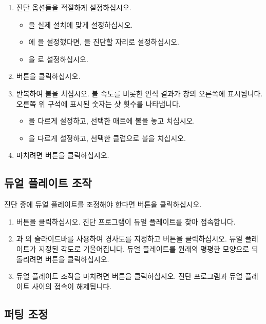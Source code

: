 \documentclass[10pt, openright, language=korean]{hzguide}
\begin{document}
\begin{enumerate}
\item 진단 옵션들을 적절하게 설정하십시오.
    \begin{itemize}
    \item {}을 실제 설치에 맞게 설정하십시오.
    \item {}에 을 설정했다면, 을 진단할 자리로 설정하십시오.
    \item {}을 로 설정하십시오.
    \end{itemize}
\item {} 버튼을 클릭하십시오.
\item 반복하여 볼을 치십시오. 볼 속도를 비롯한 인식 결과가 창의 오른쪽에 표시됩니다. 오른쪽 위 구석에 표시된 숫자는 샷 횟수를 나타냅니다.
    \begin{itemize}
    \item {}을 다르게 설정하고, 선택한 매트에 볼을 놓고 치십시오.
    \item {}을 다르게 설정하고, 선택한 클럽으로 볼을 치십시오.
    \end{itemize}
\item 마치려면  버튼을 클릭하십시오.
\end{enumerate}

\subsection{듀얼 플레이트 조작}

진단 중에 듀얼 플레이트를 조정해야 한다면  버튼을 클릭하십시오.


\begin{enumerate}
\item {} 버튼을 클릭하십시오. 진단 프로그램이 듀얼 플레이트를 찾아 접속합니다.
\item {}과 의 슬라이드바를 사용하여 경사도를 지정하고  버튼을 클릭하십시오. 듀얼 플레이트가 지정된 각도로 기울어집니다.
듀얼 플레이트를 원래의 평평한 모양으로 되돌리려면  버튼을 클릭하십시오.
\item 듀얼 플레이트 조작을 마치려면  버튼을 클릭하십시오. 진단 프로그램과 듀얼 플레이트 사이의 접속이 해제됩니다.
\end{enumerate}

\subsection{퍼팅 조정}
\end{document}
